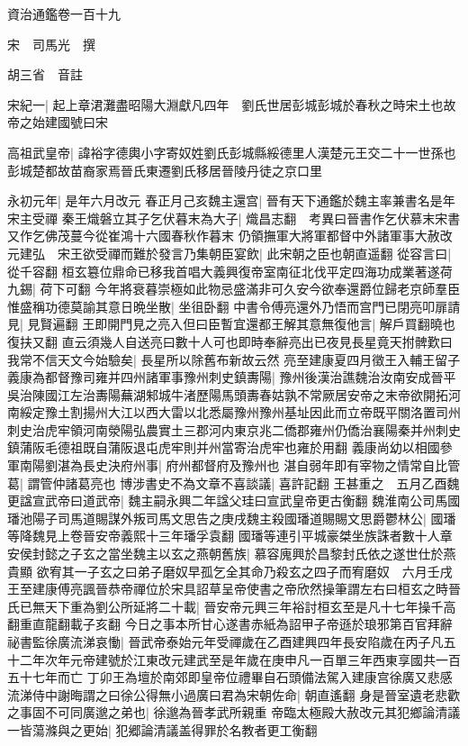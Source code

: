 資治通鑑卷一百十九


宋　司馬光　撰

胡三省　音註

宋紀一|{
	起上章涒灘盡昭陽大淵獻凡四年　劉氏世居彭城彭城於春秋之時宋土也故帝之始建國號曰宋}


高祖武皇帝|{
	諱裕字德輿小字寄奴姓劉氏彭城縣綏德里人漢楚元王交二十一世孫也彭城楚都故苗裔家焉晉氏東遷劉氏移居晉陵丹徒之京口里}


永初元年|{
	是年六月改元}
春正月己亥魏主還宫|{
	晉有天下通鑑於魏主率兼書名是年宋主受禪}
秦王熾磐立其子乞伏暮末為大子|{
	熾昌志翻　考異曰晉書作乞伏慕末宋書又作乞佛茂蔓今從崔鴻十六國春秋作暮末}
仍領撫軍大將軍都督中外諸軍事大赦改元建弘　宋王欲受禪而難於發言乃集朝臣宴飲|{
	此宋朝之臣也朝直遥翻}
從容言曰|{
	從千容翻}
桓玄簒位鼎命已移我首唱大義興復帝室南征北伐平定四海功成業著遂荷九錫|{
	荷下可翻}
今年將衰暮崇極如此物忌盛滿非可久安今欲奉還爵位歸老京師羣臣惟盛稱功德莫諭其意日晩坐散|{
	坐徂卧翻}
中書令傅亮還外乃悟而宫門已閉亮叩扉請見|{
	見賢遍翻}
王即開門見之亮入但曰臣暫宜還都王解其意無復他言|{
	解戶買翻曉也復扶又翻}
直云須幾人自送亮曰數十人可也即時奉辭亮出已夜見長星竟天拊髀歎曰我常不信天文今始驗矣|{
	長星所以除舊布新故云然}
亮至建康夏四月徵王入輔王留子義康為都督豫司雍并四州諸軍事豫州刺史鎮夀陽|{
	豫州後漢治譙魏治汝南安成晉平吳治陳國江左治夀陽蕪湖邾城牛渚歷陽馬頭夀春姑孰不常厥居安帝之末帝欲開拓河南綏定豫土割揚州大江以西大雷以北悉屬豫州豫州基址因此而立帝既平關洛置司州刺史治虎牢領河南滎陽弘農實土三郡河内東京兆二僑郡雍州仍僑治襄陽秦并州刺史鎮蒲阪毛德祖既自蒲阪退屯虎牢則并州當寄治虎牢也雍於用翻}
義康尚幼以相國參軍南陽劉湛為長史決府州事|{
	府州都督府及豫州也}
湛自弱年即有宰物之情常自比管葛|{
	謂管仲諸葛亮也}
博涉書史不為文章不喜談議|{
	喜許記翻}
王甚重之　五月乙酉魏更諡宣武帝曰道武帝|{
	魏主嗣永興二年諡父珪曰宣武皇帝更古衡翻}
魏淮南公司馬國璠池陽子司馬道賜謀外叛司馬文思告之庚戌魏主殺國璠道賜賜文思爵鬱林公|{
	國璠等降魏見上卷晉安帝義熙十三年璠孚袁翻}
國璠等連引平城豪桀坐族誅者數十人章安侯封懿之子玄之當坐魏主以玄之燕朝舊族|{
	慕容廆興於昌黎封氏依之遂世仕於燕貴顯}
欲宥其一子玄之曰弟子磨奴早孤乞全其命乃殺玄之四子而宥磨奴　六月壬戌王至建康傅亮諷晉恭帝禪位於宋具詔草呈帝使書之帝欣然操筆謂左右曰桓玄之時晉氏已無天下重為劉公所延將二十載|{
	晉安帝元興三年裕討桓玄至是凡十七年操千高翻重直龍翻載子亥翻}
今日之事本所甘心遂書赤紙為詔甲子帝遜於琅邪第百官拜辭祕書監徐廣流涕哀慟|{
	晉武帝泰始元年受禪歲在乙酉建興四年長安陷歲在丙子凡五十二年次年元帝建號於江東改元建武至是年歲在庚申凡一百單三年西東享國共一百五十七年而亡}
丁卯王為壇於南郊即皇帝位禮畢自石頭備法駕入建康宫徐廣又悲感流涕侍中謝晦謂之曰徐公得無小過廣曰君為宋朝佐命|{
	朝直遙翻}
身是晉室遺老悲歡之事固不可同廣邈之弟也|{
	徐邈為晉孝武所親重}
帝臨太極殿大赦改元其犯鄉論清議一皆蕩滌與之更始|{
	犯郷論清議盖得罪於名教者更工衡翻}


